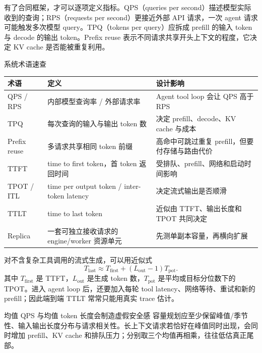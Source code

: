 有了合同框架，才可以逐项定义指标。QPS（queries per second）描述模型实际收到的查询；RPS（requests per second）更接近外部 API 请求，一次 agent 请求可能触发多次模型 query。TPQ（tokens per query）应拆成 prefill 的输入 token 与 decode 的输出 token。Prefix reuse 表示不同请求共享开头上下文的程度，它决定 KV cache 是否能被重复利用。


\begin{knowledgebox}{系统术语速查}
\begin{tabularx}{\textwidth}{L{2.5cm}YY}
\toprule
术语 & 定义 & 设计影响 \\
\midrule
QPS / RPS & 内部模型查询率 / 外部请求率 & Agent tool loop 会让 QPS 高于 RPS \\
TPQ & 每次查询的输入与输出 token 数 & 决定 prefill、decode、KV cache 与成本 \\
Prefix reuse & 多请求共享相同 token 前缀 & 高命中可跳过重复 prefill，但要付存储与路由代价 \\
TTFT & time to first token，首 token 返回时间 & 受排队、prefill、网络和启动时间影响 \\
TPOT / ITL & time per output token / inter-token latency & 决定流式输出是否顺滑 \\
TTLT & time to last token & 近似由 TTFT、输出长度和 TPOT 共同决定 \\
Replica & 一套可独立接收请求的 engine/worker 资源单元 & 先测单副本容量，再横向扩展 \\
\bottomrule
\end{tabularx}
\end{knowledgebox}

对不含复杂工具调用的流式生成，可以用近似式
\[
T_{\mathrm{last}}\approx T_{\mathrm{first}}+(L_{\mathrm{out}}-1)T_{\mathrm{pot}}.
\]
其中 $T_{\mathrm{first}}$ 是 TTFT，$L_{\mathrm{out}}$ 是生成 token 数，$T_{\mathrm{pot}}$ 是平均或目标分位数下的 TPOT。进入 agent loop 后，还要加入每轮 tool latency、网络等待、重试和新的 prefill；因此端到端 TTLT 常常只能用真实 trace 估计。

\begin{warningbox}{均值 QPS 与均值 token 长度会制造虚假安全感}
容量规划应至少保留峰值/季节性、输入输出长度分布与请求相关性。长上下文请求若恰好在峰值同时出现，会同时增加 prefill、KV cache 和排队压力；分别取三个均值再相乘，往往低估真正尾部。
\end{warningbox}


